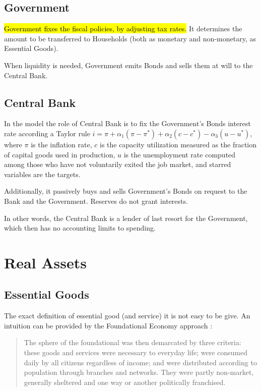 \documentclass[a4paper, headings=standardclasses]{scrartcl}
\begin{document}
\subsection{Government}
\hl{Government fixes the fiscal policies, by adjusting tax rates.} It determines the amount to be transferred to Households (both as monetary and non-monetary, as Essential Goods).

When liquidity is needed, Government emits Bonds and sells them at will to the Central Bank.

\subsection{Central Bank}
In the model the role of Central Bank is to fix the Government's Bonds interest rate according a Taylor rule $i = \pi + \alpha_1 (\pi - \pi^*) + \alpha_2 (c - c^*) - \alpha_3 (u - u^*)$, where $\pi$ is the inflation rate, $c$ is the capacity utilization measured as the fraction of capital goods used in production, $u$ is the unemployment rate computed among those who have not voluntarily exited the job market, and starred variables are the targets.

Additionally, it passively buys and sells Government's Bonds on request to the Bank and the Government. Reserves do not grant interests.

In other words, the Central Bank is a lender of last resort for the Government, which then has no accounting limits to spending.

\section{Real Assets}
\subsection{Essential Goods}
The exact definition of essential good (and service) it is not easy to be give. An intuition can be provided by the Foundational Economy approach \parencite{arcidiacono2018}: \begin{quote}
	The sphere of the foundational was then demarcated by three criteria: these goods and services were necessary to everyday life; were consumed daily by all citizens regardless of income; and were distributed according to population through branches and networks. They were partly non-market, generally sheltered and one way or another politically franchised.
\end{quote}
\end{document}
